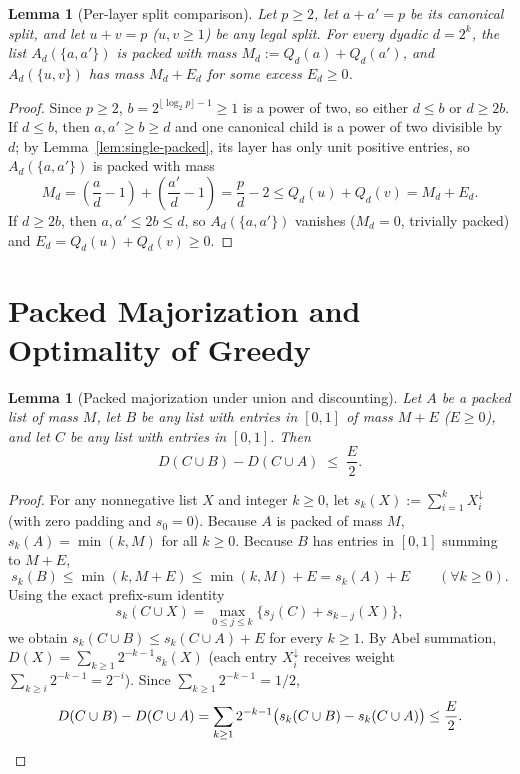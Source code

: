 \documentclass[11pt]{article}
\theoremstyle{plain}
\newtheorem{lemma}[theorem]{Lemma}
\theoremstyle{definition}
\theoremstyle{remark}
\begin{document}
\begin{lemma}[Per-layer split comparison]\label{lem:split-layer}
Let $p \ge 2$, let $a + a' = p$ be its canonical split, and let $u + v = p$ ($u, v \ge 1$) be any legal split. For every dyadic $d = 2^k$, the list $A_d(\{a, a'\})$ is packed with mass $M_d := Q_d(a) + Q_d(a')$, and $A_d(\{u, v\})$ has mass $M_d + E_d$ for some excess $E_d \ge 0$.
\end{lemma}

\begin{proof}
Since $p \ge 2$, $b = 2^{\lfloor \log_2 p \rfloor - 1} \ge 1$ is a power of two, so either $d \le b$ or $d \ge 2b$.
If $d \le b$, then $a, a' \ge b \ge d$ and one canonical child is a power of two divisible by $d$; by Lemma~\ref{lem:single-packed}, its layer has only unit positive entries, so $A_d(\{a, a'\})$ is packed with mass
\[
M_d = \left(\frac{a}{d} - 1\right) + \left(\frac{a'}{d} - 1\right) = \frac{p}{d} - 2 \le Q_d(u) + Q_d(v) = M_d + E_d.
\]
If $d \ge 2b$, then $a, a' \le 2b \le d$, so $A_d(\{a, a'\})$ vanishes ($M_d = 0$, trivially packed) and $E_d = Q_d(u) + Q_d(v) \ge 0$.
\end{proof}

\section{Packed Majorization and Optimality of Greedy}

\begin{lemma}[Packed majorization under union and discounting]\label{lem:majorize}
Let $A$ be a packed list of mass $M$, let $B$ be any list with entries in $[0, 1]$ of mass $M + E$ ($E \ge 0$), and let $C$ be any list with entries in $[0, 1]$. Then
\begin{equation}\label{eq:majorize}
D(C \cup B) - D(C \cup A) \;\le\; \frac{E}{2}.
\end{equation}
\end{lemma}

\begin{proof}
For any nonnegative list $X$ and integer $k \ge 0$, let $s_k(X) := \sum_{i=1}^k X_i^\downarrow$ (with zero padding and $s_0 = 0$). Because $A$ is packed of mass $M$, $s_k(A) = \min(k, M)$ for all $k \ge 0$. Because $B$ has entries in $[0, 1]$ summing to $M + E$,
\[
s_k(B) \le \min(k, M + E) \le \min(k, M) + E = s_k(A) + E \qquad (\forall k \ge 0).
\]
Using the exact prefix-sum identity
\[
s_k(C \cup X) = \max_{0 \le j \le k} \bigl\{s_j(C) + s_{k - j}(X)\bigr\},
\]
we obtain $s_k(C \cup B) \le s_k(C \cup A) + E$ for every $k \ge 1$.
By Abel summation, $D(X) = \sum_{k \ge 1} 2^{-k-1} s_k(X)$ (each entry $X_i^\downarrow$ receives weight $\sum_{k \ge i} 2^{-k-1} = 2^{-i}$). Since $\sum_{k \ge 1} 2^{-k-1} = 1/2$,
\[
D(C \cup B) - D(C \cup A) = \sum_{k \ge 1} 2^{-k-1}\bigl(s_k(C \cup B) - s_k(C \cup A)\bigr) \le \frac{E}{2}. \qedhere
\]
\end{proof}
\end{document}
